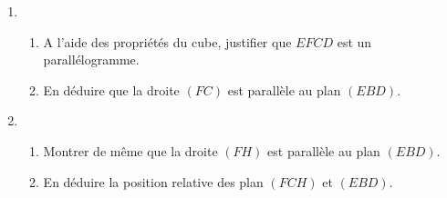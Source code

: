 \begin{enumerate}
\item
\begin{enumerate}
\item A l'aide des propriétés du cube, justifier que $EFCD$ est un parallélogramme.
\item En déduire que la droite $(FC)$ est parallèle au plan $(EBD)$.
\end{enumerate}
\item
\begin{enumerate}
\item Montrer de même que la droite $(FH)$ est parallèle au plan $(EBD)$.
\item En déduire la position relative des plan $(FCH)$ et $(EBD)$.
\end{enumerate}
\end{enumerate}